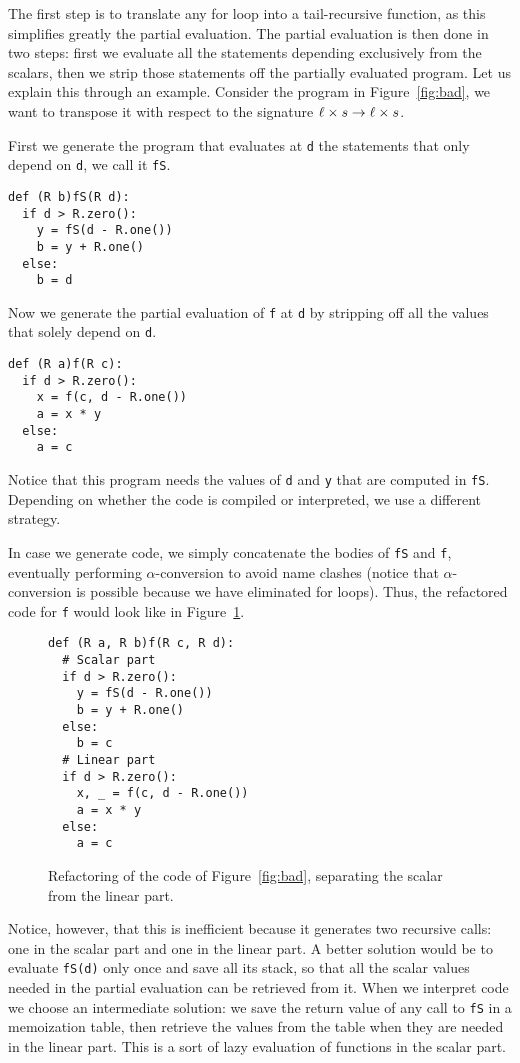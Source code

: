 The first step is to translate any for loop into a tail-recursive
function, as this simplifies greatly the partial evaluation. The
partial evaluation is then done in two steps: first we evaluate all
the statements depending exclusively from the scalars, then we strip
those statements off the partially evaluated program. Let us explain
this through an example. Consider the program in Figure~\ref{fig:bad},
we want to transpose it with respect to the signature $\ell\times
s\rightarrow\ell\times s$.

First we generate the program that evaluates at \lstinline+d+ the
statements that only depend on \lstinline+d+, we call it
\lstinline+fS+.
\begin{lstlisting}
def (R b)fS(R d):
  if d > R.zero():
    y = fS(d - R.one())
    b = y + R.one()
  else:
    b = d
\end{lstlisting}

Now we generate the partial evaluation of \lstinline+f+ at
\lstinline+d+ by stripping off all the values that solely depend on
\lstinline+d+.
\begin{lstlisting}
def (R a)f(R c):
  if d > R.zero():
    x = f(c, d - R.one())
    a = x * y
  else:
    a = c
\end{lstlisting}
Notice that this program needs the values of \lstinline+d+ and
\lstinline+y+ that are computed in \lstinline+fS+. Depending on
whether the code is compiled or interpreted, we use a different
strategy.

In case we generate code, we simply concatenate the bodies of
\lstinline+fS+ and \lstinline+f+, eventually performing
$\alpha$-conversion to avoid name clashes (notice that
$\alpha$-conversion is possible because we have eliminated for
loops). Thus, the refactored code for \lstinline+f+ would look like in
Figure~\ref{fig:bad-ref}.

\begin{figure}[t]
  \centering
\begin{lstlisting}
def (R a, R b)f(R c, R d):
  # Scalar part
  if d > R.zero():
    y = fS(d - R.one())
    b = y + R.one()
  else:
    b = c
  # Linear part
  if d > R.zero():
    x, _ = f(c, d - R.one())
    a = x * y
  else:
    a = c
\end{lstlisting}
  \caption{\label{fig:bad-ref}Refactoring of the code of
    Figure~\ref{fig:bad}, separating the scalar from the linear part.}
\end{figure}


Notice, however, that this is inefficient because it generates two
recursive calls: one in the scalar part and one in the linear part. A
better solution would be to evaluate \lstinline+fS(d)+ only once and
save all its stack, so that all the scalar values needed in the
partial evaluation can be retrieved from it. When we interpret code we
choose an intermediate solution: we save the return value of any call
to \lstinline+fS+ in a memoization table, then retrieve the values
from the table when they are needed in the linear part. This is a sort
of lazy evaluation of functions in the scalar part.

